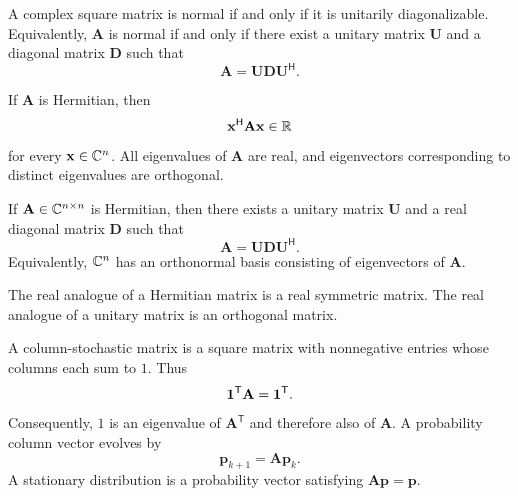     \begin{theorem}
        A complex square matrix is normal if and only if it is unitarily
        diagonalizable. Equivalently, $\mathbf{A}$ is normal if and only if
        there exist a unitary matrix $\mathbf{U}$ and a diagonal matrix
        $\mathbf{D}$ such that
        \[
            \mathbf{A}
            =
            \mathbf{U}\mathbf{D}\mathbf{U}^{\mathsf H}.
        \]
    \end{theorem}

    \begin{proposition}
        If $\mathbf{A}$ is Hermitian, then
        \[
            \mathbf{x}^{\mathsf H}\mathbf{A}\mathbf{x}\in\mathbb{R}
        \]
        for every $\mathbf{x}\in\mathbb{C}^n$. All eigenvalues of $\mathbf{A}$ are real,
        and eigenvectors corresponding to distinct eigenvalues are orthogonal.
    \end{proposition}

    \begin{theorem}
        If $\mathbf{A}\in\mathbb{C}^{n\times n}$ is Hermitian, then there exists a
        unitary matrix $\mathbf{U}$ and a real diagonal matrix $\mathbf{D}$ such that
        \[
            \mathbf{A}
            =
            \mathbf{U}\mathbf{D}\mathbf{U}^{\mathsf H}.
        \]
        Equivalently, $\mathbb{C}^n$ has an orthonormal basis consisting of eigenvectors
        of $\mathbf{A}$.
    \end{theorem}

    \begin{remark}
        The real analogue of a Hermitian matrix is a real symmetric matrix.
        The real analogue of a unitary matrix is an orthogonal matrix.
    \end{remark}

    \begin{definition}
        A column-stochastic matrix is a square matrix with nonnegative entries
        whose columns each sum to $1$. Thus
        \[
            \mathbf{1}^{\mathsf T}\mathbf{A}=\mathbf{1}^{\mathsf T}.
        \]
        Consequently, $1$ is an eigenvalue of $\mathbf{A}^{\mathsf T}$ and
        therefore also of $\mathbf{A}$. A probability column vector evolves by
        \[
            \mathbf{p}_{k+1}=\mathbf{A}\mathbf{p}_k.
        \]
        A stationary distribution is a probability vector satisfying
        $\mathbf{A}\mathbf{p}=\mathbf{p}$.
    \end{definition}

